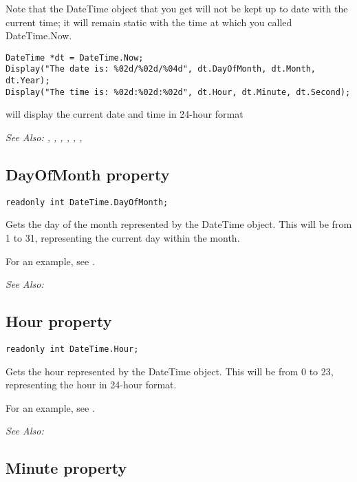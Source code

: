 Note that the DateTime object that you get will not be kept up to date with the current time;
it will remain static with the time at which you called DateTime.Now.

\begin{verbatim}
DateTime *dt = DateTime.Now;
Display("The date is: %02d/%02d/%04d", dt.DayOfMonth, dt.Month, dt.Year);
Display("The time is: %02d:%02d:%02d", dt.Hour, dt.Minute, dt.Second);
\end{verbatim}
will display the current date and time in 24-hour format

\it{See Also:} ,
,
,
,
,
,


\subsection{DayOfMonth property}\label{DateTime.DayOfMonth}%

\begin{verbatim}
readonly int DateTime.DayOfMonth;
\end{verbatim}
Gets the day of the month represented by the DateTime object. This will be from 1 to 31,
representing the current day within the month.

For an example, see .

\it{See Also:} 


\subsection{Hour property}\label{DateTime.Hour}%

\begin{verbatim}
readonly int DateTime.Hour;
\end{verbatim}
Gets the hour represented by the DateTime object. This will be from 0 to 23,
representing the hour in 24-hour format.

For an example, see .

\it{See Also:} 


\subsection{Minute property}\label{DateTime.Minute}%

